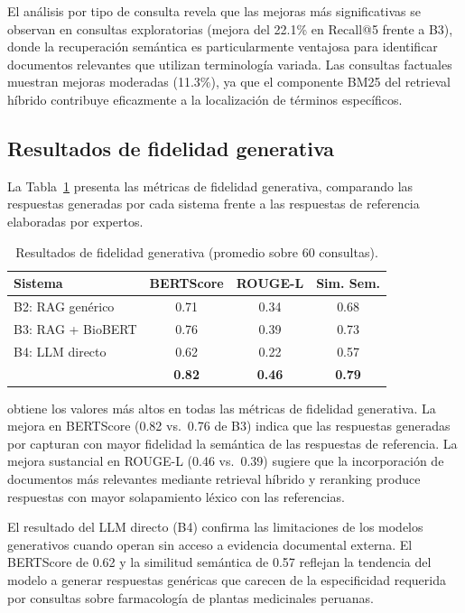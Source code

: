 El análisis por tipo de consulta revela que las mejoras más significativas se observan en consultas exploratorias (mejora del 22.1\% en Recall@5 frente a B3), donde la recuperación semántica es particularmente ventajosa para identificar documentos relevantes que utilizan terminología variada. Las consultas factuales muestran mejoras moderadas (11.3\%), ya que el componente BM25 del retrieval híbrido contribuye eficazmente a la localización de términos específicos.

\subsection{Resultados de fidelidad generativa}
\label{subsec:res_faithfulness}

La Tabla~\ref{tab:generation_results} presenta las métricas de fidelidad generativa, comparando las respuestas generadas por cada sistema frente a las respuestas de referencia elaboradas por expertos.

\begin{table}[!t]
\centering
\caption{Resultados de fidelidad generativa (promedio sobre 60 consultas).}
\label{tab:generation_results}
\renewcommand{\arraystretch}{1.3}
\footnotesize
\begin{tabular}{l c c c}
\toprule
\textbf{Sistema} & \textbf{BERTScore} & \textbf{ROUGE-L} & \textbf{Sim. Sem.} \\
\midrule
B2: RAG genérico   & 0.71 & 0.34 & 0.68 \\
B3: RAG + BioBERT  & 0.76 & 0.39 & 0.73 \\
B4: LLM directo    & 0.62 & 0.22 & 0.57 \\
\midrule
\textbf{\sirca{}}  & \textbf{0.82} & \textbf{0.46} & \textbf{0.79} \\
\bottomrule
\end{tabular}
\end{table}

\sirca{} obtiene los valores más altos en todas las métricas de fidelidad generativa. La mejora en BERTScore (0.82 vs.\ 0.76 de B3) indica que las respuestas generadas por \sirca{} capturan con mayor fidelidad la semántica de las respuestas de referencia. La mejora sustancial en ROUGE-L (0.46 vs.\ 0.39) sugiere que la incorporación de documentos más relevantes mediante retrieval híbrido y reranking produce respuestas con mayor solapamiento léxico con las referencias.

El resultado del LLM directo (B4) confirma las limitaciones de los modelos generativos cuando operan sin acceso a evidencia documental externa. El BERTScore de 0.62 y la similitud semántica de 0.57 reflejan la tendencia del modelo a generar respuestas genéricas que carecen de la especificidad requerida por consultas sobre farmacología de plantas medicinales peruanas.

